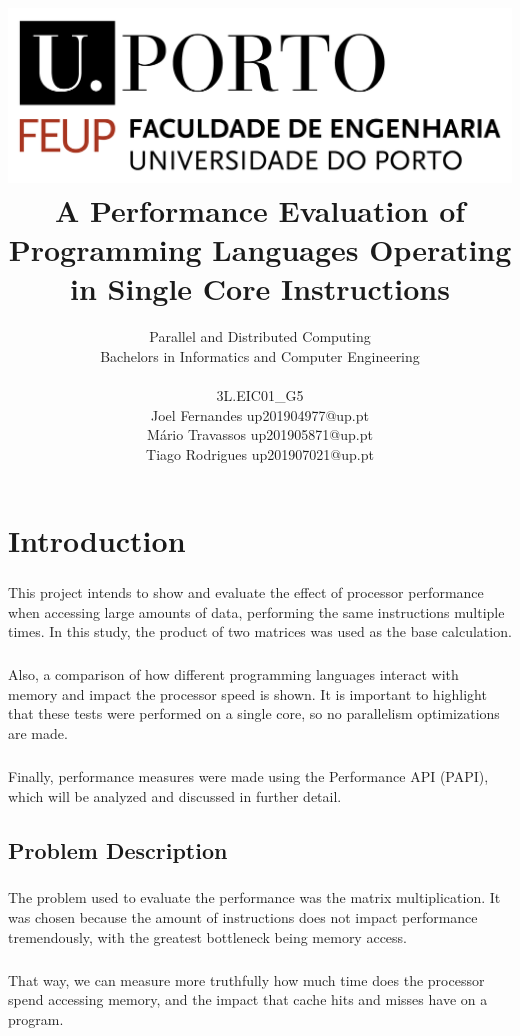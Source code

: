 \documentclass{report}
\title{\includegraphics[scale=0.3]{logo.png} \\ \textbf{A Performance Evaluation of Programming Languages Operating in Single Core Instructions}}
\author{Parallel and Distributed Computing \\ Bachelors in Informatics and Computer Engineering \\ \\ 3L.EIC01\_G5   \\ Joel Fernandes up201904977@up.pt \\ Mário Travassos up201905871@up.pt \\ Tiago Rodrigues up201907021@up.pt }
\begin{document}
    \maketitle

    \tableofcontents

    \chapter{Introduction}

    \paragraph{}This project intends to show and evaluate the effect of processor performance when accessing large amounts of data, performing the same instructions multiple times. In this study, the product of two matrices was used as the base calculation.

    \paragraph{}Also, a comparison of how different programming languages interact with memory and impact the processor speed is shown. It is important to highlight that these tests were performed on a single core, so no parallelism optimizations are made.

    \paragraph{}Finally, performance measures were made using the Performance API (PAPI), which will be analyzed and discussed in further detail.

    \section{Problem Description}

    \paragraph{}The problem used to evaluate the performance was the matrix multiplication. It was chosen because the amount of instructions does not impact performance tremendously, with the greatest bottleneck being memory access.

    \paragraph{}That way, we can measure more truthfully how much time does the processor spend accessing memory, and the impact that cache hits and misses have on a program.
\end{document}

